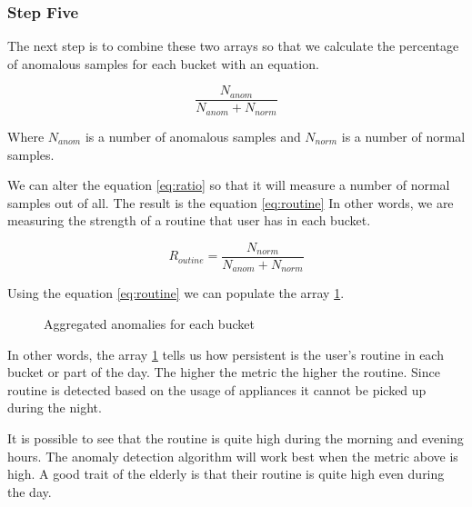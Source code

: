 \subsubsection{Step Five}

The next step is to combine these two arrays so that we calculate the percentage of anomalous samples 
for each bucket with an equation. 

\begin{equation}
    \frac{N_{anom}}{N_{anom}+N_{norm}}
    \label{eq:ratio}
\end{equation}

Where $N_{anom}$ is a number of anomalous samples and $N_{norm}$ is a number of normal samples.


We can alter the equation \ref{eq:ratio} so that it will measure
a number of normal samples out of all. 
The result is the equation \ref{eq:routine}
In other words, we are measuring the strength of a routine that 
user has in each bucket.

\begin{equation}
    R_{outine}= \frac{N_{norm}}{N_{anom}+N_{norm}}
    \label{eq:routine}
\end{equation}

Using the equation \ref{eq:routine} we can populate the array \ref{arr:anom_ratio}.

\begin{figure}[H]
    \centering
    \caption{Aggregated anomalies for each bucket}
    \label{arr:anom_ratio}
\end{figure}

In other words, the array \ref{arr:anom_ratio} tells us how persistent is the user's routine in each bucket or part of the day. 
The higher the metric the higher the routine. 
Since routine is detected based on the usage of appliances it cannot be picked up during the night.

It is possible to see that the routine is quite high during the morning and evening hours.
The anomaly detection algorithm will work best when the metric above is high.
A good trait of the elderly is that their routine is quite high even during the day.


